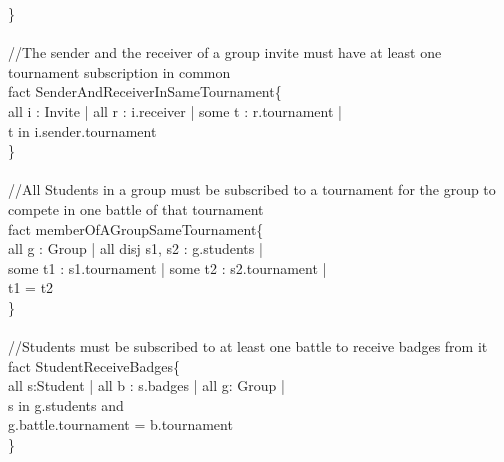 \documentclass{article}
\begin{document}
{\}\\
\\
\color{gray}
//The sender and the receiver of a group invite must have at least one tournament subscription in common\\
\color{black}
\color{blue} fact \color{black} SenderAndReceiverInSameTournament\{\\
\-\hspace{1cm} \color{blue} all \color{black} i : Invite | \color{blue} all \color{black} r : i.receiver |  \color{blue} some \color{black} t : r.tournament | \\
\-\hspace{1cm} t \color{blue} in \color{black} i.sender.tournament\\
\}\\
\\
\color{gray}
//All Students in a group must be subscribed to a tournament for the group to compete in one battle of that tournament\\%
\color{black}
\color{blue} fact \color{black} memberOfAGroupSameTournament\{\\
\-\hspace{1cm} \color{blue} all \color{black} g : Group | \color{blue} all disj \color{black} s1, s2 : g.students | \\
\-\hspace{1cm} \color{blue} some \color{black} t1 : s1.tournament | \color{blue} some \color{black} t2 : s2.tournament | \\
\-\hspace{1cm} t1 \color{blue} = \color{black} t2\\
\}\\
\\
\color{gray}
//Students must be subscribed to at least one battle to receive badges from it\\
\color{black}
\color{blue} fact \color{black} StudentReceiveBadges\{\\
\-\hspace{1cm} \color{blue} all \color{black} s:Student | \color{blue} all \color{black} b : s.badges | \color{blue} all \color{black} g: Group |  \\
\-\hspace{1cm} s \color{blue} in \color{black} g.students and    \\
\-\hspace{1cm} g.battle.tournament \color{blue} = \color{black} b.tournament\\
\}\\
}
\end{document}
